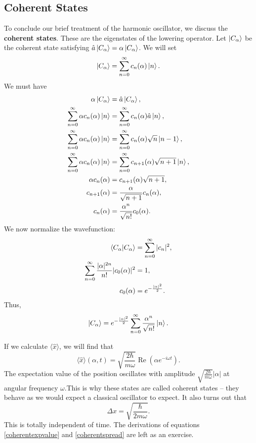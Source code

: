 \subsection{Coherent States}
To conclude our brief treatment of the harmonic oscillator, we discuss the \textbf{coherent states}. These are the eigenstates of the lowering operator. Let $\left| C_\alpha \right\rangle$ be the coherent state satisfying $\hat{a} \left| C_\alpha \right\rangle = \alpha \left| C_\alpha \right\rangle$. We will set \begin{equation} \left| C_\alpha \right\rangle  = \sum \limits_{n=0}^{\infty} c_n(\alpha) \left| n \right\rangle. \end{equation}
We must have 
\begin{align*}
\alpha \left| C_\alpha \right\rangle &=  \hat{a} \left| C_\alpha \right\rangle, \\
\sum \limits_{n=0}^{\infty}\alpha c_n(\alpha) \left| n \right\rangle &= \sum \limits_{n=0}^{\infty} c_n(\alpha) \hat{a} \left| n \right\rangle, \\
\sum \limits_{n=0}^{\infty}\alpha c_n(\alpha) \left| n \right\rangle &= \sum \limits_{n=0}^{\infty} c_n(\alpha) \sqrt{n} \left| n-1 \right\rangle,\\
\sum \limits_{n=0}^{\infty}\alpha c_n(\alpha) \left| n \right\rangle &= \sum \limits_{n=0}^{\infty} c_{n+1}(\alpha) \sqrt{n+1} \left| n \right\rangle,\\
\alpha c_n(\alpha) &=  c_{n+1}(\alpha) \sqrt{n+1},\\
c_{n+1} (\alpha) &= \frac{\alpha}{\sqrt{n+1}} c_n (\alpha), \\
c_n (\alpha) &= \frac{\alpha^n}{\sqrt{n!}} c_0 (\alpha).
\end{align*}
We now normalize the wavefunction:
\begin{align*}
\left\langle C_\alpha \middle| C_\alpha \right\rangle &= \sum \limits_{n=0}^{\infty} |c_n|^2, \\
\sum \limits_{n=0}^{\infty } \frac{|\alpha|^{2n}}{n!} |c_0 (\alpha)|^2 &= 1,\\
c_0 (\alpha) &= e^{-\frac{|\alpha|^2}{2}}.
\end{align*}
Thus, 
\begin{equation}
 \left| C_\alpha \right\rangle = e^{-\frac{|\alpha|^2}{2}}\sum\limits_{n=0}^{\infty} \frac{\alpha^n}{\sqrt{n!}} \left| n \right\rangle.
\end{equation}

If we calculate $\langle \hat{x} \rangle$, we will find that 
\begin{equation}
\langle \hat{x} \rangle (\alpha, t) = \sqrt{\frac{2\hbar}{m\omega}} \operatorname{Re} (\alpha e^{-i\omega t}) \label{coherentexpvalue}.
\end{equation}
The expectation value of the position oscillates with amplitude $\sqrt{\frac{2\hbar}{m\omega}}  |\alpha|$ at angular frequency $\omega$.This is why these states are called coherent states – they behave as we would expect a classical oscillator to expect. It also turns out that 
\begin{equation}
\Delta x = \sqrt{\frac{\hbar}{2m\omega}}. \label{coherentspread}
\end{equation}
This is totally independent of time. The derivations of equations \ref{coherentexpvalue} and \ref{coherentspread} are left as an exercise.